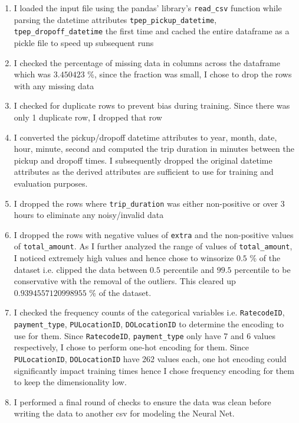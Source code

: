 \documentclass{article}
\begin{document}
\begin{enumerate}
    \item I loaded the input file using the pandas' library's \verb|read_csv| function while parsing the datetime attributes \verb|tpep_pickup_datetime|, \\ 
    \verb|tpep_dropoff_datetime| the first time and cached 
    the entire dataframe as a pickle file to speed up subsequent runs
    \item I checked the percentage of missing data in columns across the dataframe which was $3.450423$ \%, since the fraction was small, I chose to drop the rows with any missing data
    \item I checked for duplicate rows to prevent bias during training. Since there was only 1 duplicate row, I dropped that row
    \item I converted the pickup/dropoff datetime attributes to year, month, date, hour, minute, second and computed the trip duration in minutes between the pickup and dropoff times. I subsequently dropped the original datetime attributes as the derived attributes are sufficient to use for training and evaluation purposes.
    \item I dropped the rows where \verb|trip_duration| was either non-positive or over 3 hours to eliminate any noisy/invalid data
    \item I dropped the rows with negative values of \verb|extra| and the non-positive values of \verb|total_amount|. As I further analyzed the range of values of \verb|total_amount|, I noticed extremely high values and hence chose to winsorize $0.5$ \% of the dataset i.e. clipped the data between $0.5$ percentile and $99.5$ percentile to be conservative with the removal of the outliers. This cleared up $0.9394557120998955$ \% of the dataset. 
    \item I checked the frequency counts of the categorical variables i.e. \verb|RatecodeID|, \verb|payment_type|, \verb|PULocationID|, \verb|DOLocationID| to determine the encoding to use for them. Since \verb|RatecodeID|, \verb|payment_type| only have 7 and 6 values respectively, I chose to perform one-hot encoding for them. Since \verb|PULocationID|, \verb|DOLocationID| have 262 values each, one hot encoding could significantly impact training times hence I chose frequency encoding for them to keep the dimensionality low.
    \item I performed a final round of checks to ensure the data was clean before writing the data to another csv for modeling the Neural Net.
\end{enumerate} \\
\end{document}

